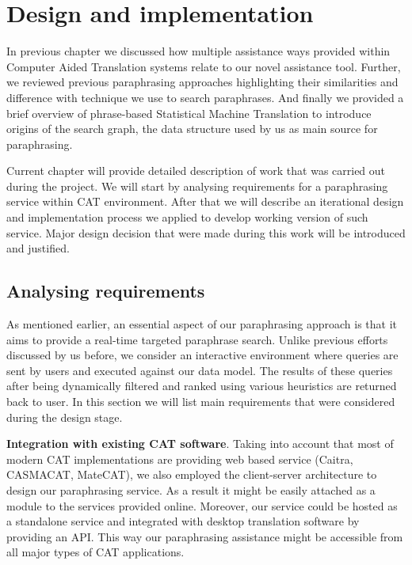 \chapter{Design and implementation}

In previous chapter we discussed how multiple assistance ways provided within Computer Aided Translation systems relate to our novel assistance tool. Further, we reviewed previous paraphrasing approaches highlighting their similarities and difference with technique we use to search paraphrases. And finally we provided a brief overview of phrase-based Statistical Machine Translation to introduce origins of the search graph, the data structure used by us as main source for paraphrasing.

Current chapter will provide detailed description of work that was carried out during the project. We will start by analysing requirements for a paraphrasing service within CAT environment. After that we will describe an iterational design and implementation process we applied to develop working version of such service. Major design decision that were made during this work will be introduced and justified. 

\section{Analysing requirements}

As mentioned earlier, an essential aspect of our paraphrasing approach is that it aims to provide a real-time targeted paraphrase search. Unlike previous efforts discussed by us before, we consider an interactive environment where queries are sent by users and executed against our data model. The results of these queries after being dynamically filtered and ranked using various heuristics are returned back to user. In this section we will list main requirements that were considered during the design stage.

\textbf{Integration with existing CAT software}. Taking into account that most of modern CAT implementations are providing web based service (Caitra, CASMACAT, MateCAT), we also employed the client-server architecture to design our paraphrasing service. As a result it might be easily attached as a module to the services provided online. Moreover, our service could be hosted as a standalone service and integrated with desktop translation software by providing an API. This way our paraphrasing assistance might be accessible from all major types of CAT applications.

